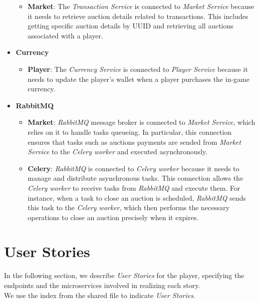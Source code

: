 \documentclass{article}
\begin{document}
\begin{itemize}
\begin{itemize}
              \item \textbf{Market}: The \emph{Transaction Service} is connected to \emph{Market Service} because it needs to retrieve auction details related to transactions. This includes getting specific auction details by UUID and retrieving all auctions associated with a player.
          \end{itemize}
    \item \textbf{Currency}
          \begin{itemize}
              \item \textbf{Player}: The \emph{Currency Service} is connected to \emph{Player Service} because it needs to update the player's wallet when a player purchases the in-game currency.
          \end{itemize}
    \item \textbf{RabbitMQ}
          \begin{itemize}
              \item \textbf{Market}: \emph{RabbitMQ} message broker is connected to \emph{Market Service}, which relies on it to handle tasks queueing. In particular, this connection ensures that tasks such as auctions payments are sended from \emph{Market Service} to the \emph{Celery worker} and executed asynchronously.
              \item \textbf{Celery}: \emph{RabbitMQ} is connected to \emph{Celery worker} because it needs to manage and distribute asynchronous tasks. This connection allows the \emph{Celery worker} to receive tasks from \emph{RabbitMQ} and execute them. For instance, when a task to close an auction is scheduled, \emph{RabbitMQ} sends this task to the \emph{Celery worker}, which then performs the necessary operations to close an auction precisely when it expires.
          \end{itemize}
\end{itemize}

\newpage

\section{User Stories}
In the following section, we describe \emph{User Stories} for the player, specifying the endpoints and the microservices involved in realizing each story.\\ We use the index from the shared file to indicate \emph{User Stories}.
\vspace{1em}
\end{document}
